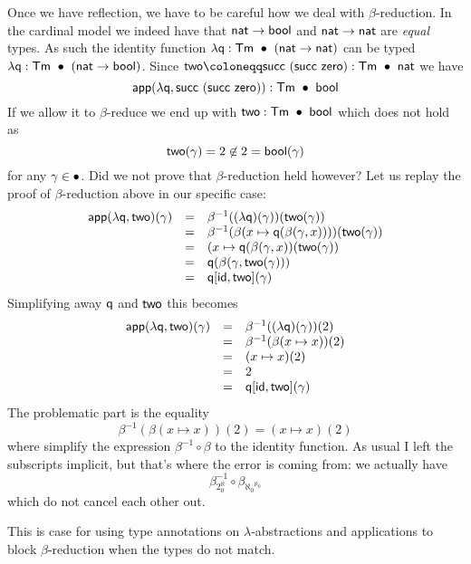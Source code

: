 Once we have reflection, we have to be careful how we deal with
\(\beta\)-reduction. In the cardinal model we indeed have that
\(\mathsf{nat} \to \mathsf{bool}\) and \(\mathsf{nat} \to \mathsf{nat}\) are \emph{equal} types.
As such the identity function \(\lambda \mathsf{q} : \mathsf{Tm}\ \bullet\ (\mathsf{nat} \to \mathsf{nat})\)
can be typed \(\lambda \mathsf{q} : \mathsf{Tm}\ \bullet\ (\mathsf{nat} \to \mathsf{bool})\).
Since \(\ctwo \coloneqq \csucc\ (\csucc\ \czero) : \CTm\ \ctxempty\ \nat\)
we have
\[
  \mathsf{app}(\lambda \mathsf{q}, \mathsf{succ}\ (\mathsf{succ}\ \mathsf{zero})) : \mathsf{Tm}\ \bullet\ \mathsf{bool}
\]
If we allow it to \(\beta\)-reduce we end up with
\(\ctwo : \CTm\ \ctxempty\ \bool\) which does not hold as
\[
  \mathsf{two}(\gamma) = 2 \not\in 2 = \mathsf{bool}(\gamma)
\]
for any \(\gamma \in \bullet\).
Did we not prove that \(\beta\)-reduction held however?
Let us replay the proof of \(\beta\)-reduction above in our specific case:
\[
  \begin{array}{rcl}
    \mathsf{app}(\lambda \mathsf{q}, \mathsf{two})(\gamma)
    &=& \beta^{-1}((\lambda \mathsf{q})(\gamma))(\mathsf{two}(\gamma)) \\
    &=& \beta^{-1}(\beta(x \mapsto \mathsf{q}(\beta(\gamma,x))))(\mathsf{two}(\gamma)) \\
    &=& (x \mapsto \mathsf{q}(\beta(\gamma,x))(\mathsf{two}(\gamma)) \\
    &=& \mathsf{q}(\beta(\gamma, \mathsf{two}(\gamma))) \\
    &=& \mathsf{q}[\mathsf{id}, \mathsf{two}](\gamma)
  \end{array}
\]
Simplifying away \(\mathsf{q}\) and \(\mathsf{two}\) this becomes
\[
  \begin{array}{rcl}
    \mathsf{app}(\lambda \mathsf{q}, \mathsf{two})(\gamma)
    &=& \beta^{-1}((\lambda \mathsf{q})(\gamma))(2) \\
    &=& \beta^{-1}(\beta(x \mapsto x))(2) \\
    &=& (x \mapsto x)(2) \\
    &=& 2 \\
    &=& \mathsf{q}[\mathsf{id}, \mathsf{two}](\gamma)
  \end{array}
\]
The problematic part is the equality
\[
  \beta^{-1}(\beta(x \mapsto x))(2) = (x \mapsto x)(2)
\]
where simplify the expression \(\beta^{-1} \circ \beta\) to the identity
function. As usual I left the subscripts implicit, but that's where the error
is coming from: we actually have
\[
  \beta_{2^\aleph_0}^{-1} \circ \beta_{{\aleph_0}^{\aleph_0}}
\]
which do not cancel each other out.

This is case for using type annotations on \(\lambda\)-abstractions and
applications to block \(\beta\)-reduction when the types do not match.

